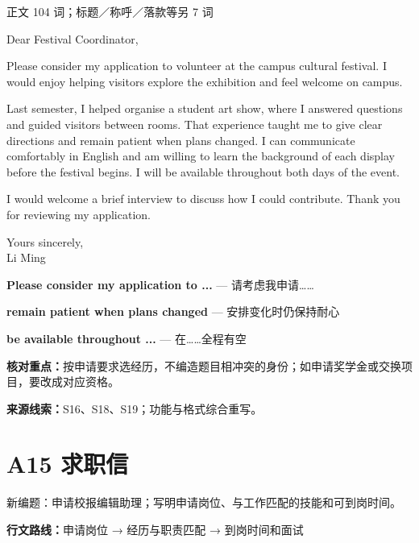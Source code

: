 \documentclass[11pt,a4paper,fontset=macnew]{ctexart}
\newenvironment{example}{\begingroup\fontsize{11}{14.3}\selectfont\setlength{\parskip}{4pt}}{\par\endgroup}
\begin{document}
{\small 正文 104 词；标题／称呼／落款等另 7 词}\par
\begin{example}
\noindent Dear Festival Coordinator,\par
Please consider my application to volunteer at the campus cultural festival. I would enjoy helping visitors explore the exhibition and feel welcome on campus.

Last semester, I helped organise a student art show, where I answered questions and guided visitors between rooms. That experience taught me to give clear directions and remain patient when plans changed. I can communicate comfortably in English and am willing to learn the background of each display before the festival begins. I will be available throughout both days of the event.

I would welcome a brief interview to discuss how I could contribute. Thank you for reviewing my application.

\noindent Yours sincerely,\\Li Ming\par
\end{example}
\par\vspace{4pt}{\bfseries 好词好句：优先记这三处}\par\nopagebreak
{\small\textbf{Please consider my application to ...} — 请考虑我申请……}\par
{\small\textbf{remain patient when plans changed} — 安排变化时仍保持耐心}\par
{\small\textbf{be available throughout ...} — 在……全程有空}\par
{\small\textbf{核对重点：}按申请要求选经历，不编造题目相冲突的身份；如申请奖学金或交换项目，要改成对应资格。}\par
{\fontsize{8}{10}\selectfont\textbf{来源线索：}S16、S18、S19；功能与格式综合重写。}\par
\clearpage\section*{A15  求职信}
{\small 新编题：申请校报编辑助理；写明申请岗位、与工作匹配的技能和可到岗时间。}\par
{\small\textbf{行文路线：}申请岗位 → 经历与职责匹配 → 到岗时间和面试}\par
\par\vspace{4pt}{\bfseries 可替换模板}\par\nopagebreak
\end{document}
